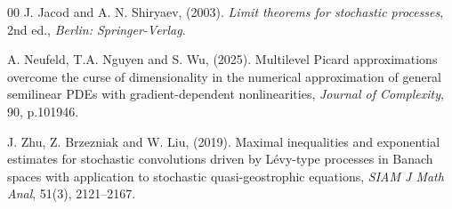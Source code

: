 \documentclass[11pt]{article}
\theoremstyle{theorem}
\theoremstyle{definition}
\newcommand{\1}{{\bf 1}}
\begin{document}
\begin{thebibliography}{00}
J. Jacod and A. N. Shiryaev, (2003). \emph{Limit theorems for stochastic processes}, 2nd ed., \emph{Berlin: Springer-Verlag}.

A. Neufeld, T.A. Nguyen and S. Wu, (2025). Multilevel Picard approximations overcome the curse of dimensionality in the numerical approximation of general semilinear PDEs with gradient-dependent nonlinearities, \emph{Journal of Complexity}, 90, p.101946.


	J. Zhu, Z. Brzezniak and W. Liu, (2019). Maximal inequalities and exponential estimates for stochastic convolutions driven by L\'evy-type processes in Banach spaces with application to stochastic quasi-geostrophic equations, \emph{SIAM J Math Anal}, 51(3), 2121--2167.


\end{thebibliography}
\end{document}
